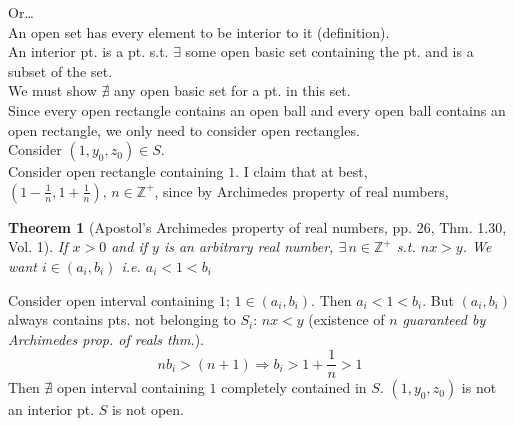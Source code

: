 \documentclass[twoside]{amsart}
\theoremstyle{plain}
\newtheorem{theorem}{Theorem}
\theoremstyle{definition}
\begin{document}
\begin{enumerate}
Or\dots \\

An open set has every element to be interior to it (definition).  \\
An interior pt. is a pt. s.t. $\exists$ some open basic set containing the pt. and is a subset of the set.  \\

We must show $\nexists$ any open basic set for a pt. in this set.  \\
Since every open rectangle contains an open ball and every open ball contains an open rectangle, we only need to consider open rectangles.   \\

Consider $(1,y_0,z_0)\in S$. \\
Consider open rectangle containing $1$.  I claim that at best, $\left( 1 - \frac{1}{n}, 1 + \frac{1}{n} \right), \, n\in \mathbb{Z}^+$, since by Archimedes property of real numbers,

\begin{theorem}[Apostol's Archimedes property of real numbers, pp. 26, Thm. 1.30, Vol. 1] If $x>0$ and if $y$ is an arbitrary real number, $\exists \, n\in \mathbb{Z}^+$ s.t. $nx > y$.  We want $i \in (a_i, b_i)$ i.e. $a_i < 1 < b_i$
\end{theorem}
Consider open interval containing $1$; $1 \in (a_i,b_i)$.  Then $a_i < 1 < b_i$.  But $(a_i,b_i)$ always contains pts. not belonging to $S_i$: $nx <y$ (existence of $n$ \emph{ guaranteed by Archimedes prop. of reals thm.}).  
\[
nb_i > (n+1) \Longrightarrow b_i > 1 + \frac{1}{n} > 1
\]
Then $\nexists$ open interval containing $1$ completely contained in $S$.  $(1,y_0,z_0)$ is not an interior pt.  $S$ is not open.  




\end{enumerate}
\end{document}
